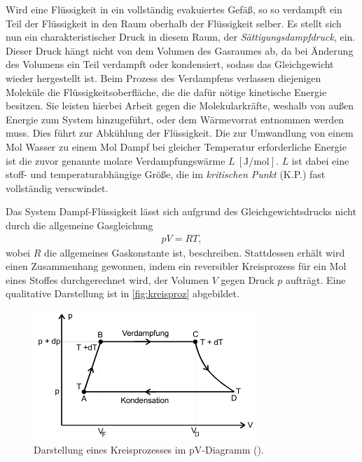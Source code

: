 \noindent
Wird eine Flüssigkeit in ein vollständig evakuiertes Gefäß, so so verdampft ein Teil der Flüssigkeit in den Raum oberhalb der Flüssigkeit
selber. Es stellt sich nun ein charakteristischer Druck in diesem Raum, der \textit{Sättigungsdampfdruck}, ein.
Dieser Druck hängt nicht von dem Volumen des Gasraumes ab, da bei Änderung des Volumens ein Teil verdampft oder kondensiert, sodass das
Gleichgewicht wieder hergestellt ist.
Beim Prozess des Verdampfens verlassen diejenigen Moleküle die Flüssigkeitsoberfläche, die die dafür nötige kinetische Energie besitzen.
Sie leisten hierbei Arbeit gegen die Molekularkräfte, weshalb von außen Energie zum System hinzugeführt, oder dem Wärmevorrat entnommen werden
muss. Dies führt zur Abkühlung der Flüssigkeit. Die zur Umwandlung von einem Mol Wasser zu einem Mol Dampf bei gleicher Temperatur 
erforderliche Energie ist die zuvor genannte molare Verdampfungswärme $L \: [\si{\joule\per\mol}]$.
$L$ ist dabei eine stoff- und temperaturabhängige Größe, die im \textit{kritischen Punkt} (K.P.) fast vollständig verscwindet.



\noindent
Das System Dampf-Flüssigkeit lässt sich aufgrund des Gleichgewichtsdrucks nicht durch die allgemeine Gasgleichung 
\begin{align}
    \label{eqn:gasgl}
    pV = RT,
\end{align}
wobei $R$ die allgemeines Gaskonstante ist, beschreiben. Stattdessen erhält wird einen Zusammenhang gewonnen, indem ein reversibler Kreisprozess
für ein Mol eines Stoffes durchgerechnet wird, der Volumen $V$ gegen Druck $p$ aufträgt. 
Eine qualitative Darstellung ist in \autoref{fig:kreisproz} abgebildet.

\begin{figure}[H]
    \centering
    \includegraphics[width=0.75\textwidth]{daten/Dampfdruckkurve.png}
    \caption{Darstellung eines Kreisprozesses im pV-Diagramm (\cite{anleitung}).}
    \label{fig:kreisproz}
\end{figure}

